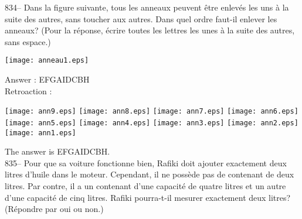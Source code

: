﻿\documentclass[letterpaper, 12pt]{article}
\begin{document}
834-- Dans la figure suivante, tous les anneaux peuvent \^etre enlev\'es les
uns \`a la suite des autres, sans toucher aux autres.  Dans quel ordre
faut-il enlever les anneaux? (Pour la r\'eponse, \'ecrire toutes les lettres
les unes \`a la suite des autres, sans espace.)\\
    \begin{center}
    \texttt{[image: anneau1.eps]}
    \end{center}


Answer : EFGAIDCBH  \\

Retroaction : \\
    \begin{center}
    \texttt{[image: ann9.eps]}
    \texttt{[image: ann8.eps]}
    \texttt{[image: ann7.eps]}
    \texttt{[image: ann6.eps]}
    \texttt{[image: ann5.eps]}
    \texttt{[image: ann4.eps]}
    \texttt{[image: ann3.eps]}
    \texttt{[image: ann2.eps]}
    \texttt{[image: ann1.eps]}
    \end{center}


The answer is EFGAIDCBH.\\

835-- Pour que sa voiture fonctionne bien, Rafiki doit ajouter exactement
deux litres d'huile dans le moteur.  Cependant, il ne poss\`ede pas de
contenant de deux litres.  Par contre, il a un contenant d'une capacit\'e de
quatre litres et un autre d'une capacit\'e de cinq litres.  Rafiki
pourra-t-il mesurer exactement deux litres?  (R\'epondre par oui ou non.)\\
\end{document}
